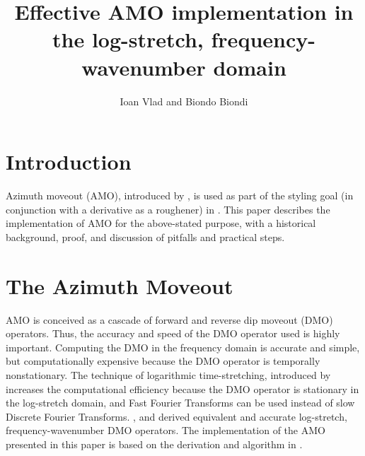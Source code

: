 \shortnote


\title{Effective AMO implementation in the log-stretch,
frequency-wavenumber domain}

\author{Ioan Vlad and Biondo Biondi}

\maketitle
\section{Introduction}
Azimuth moveout (AMO), introduced by , is used as
part of the styling goal (in conjunction with a derivative as a
roughener) in . This paper describes the
implementation of AMO for the above-stated purpose, with a
historical background, proof, and discussion of pitfalls and practical
steps.

\section{The Azimuth Moveout}
AMO is conceived as a
cascade of forward and reverse dip moveout (DMO) operators. Thus, the
accuracy and speed of the DMO operator used is highly
important. Computing the DMO in the frequency domain is accurate and
simple, but computationally expensive because the DMO operator is temporally
nonstationary. The technique of logarithmic time-stretching,
introduced by  increases the computational
efficiency because the DMO operator is stationary in the log-stretch
domain, and Fast Fourier Transforms can be used instead of slow
Discrete Fourier Transforms. ,  and
 derived equivalent and accurate log-stretch,
frequency-wavenumber DMO operators. The implementation of the AMO presented in
this paper is based on the derivation and algorithm in
. 

